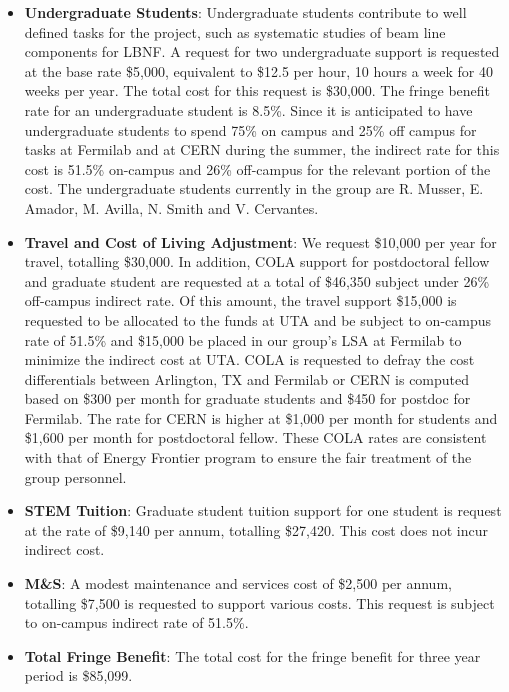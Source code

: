 \begin{enumerate}
\begin{itemize}[noitemsep,nolistsep]
\item {{\bf Undergraduate Students}: Undergraduate students contribute to well defined tasks for the project, such as systematic studies of beam line components for LBNF.  A request for two undergraduate support is requested at the base rate \$5,000, equivalent to \$12.5 per hour, 10 hours a week for 40 weeks per year.  The total cost for this request is \$30,000.  The fringe benefit rate for an undergraduate student is 8.5\%.  Since it is anticipated to have undergraduate students to spend 75\% on campus and 25\% off campus for tasks at Fermilab and at CERN during the summer, the indirect rate for this cost is 51.5\% on-campus and 26\% off-campus for the relevant portion of the cost.   The undergraduate students currently in the group are R. Musser,  E. Amador, M. Avilla, N. Smith and V. Cervantes.}

\item{{\bf Travel and Cost of Living Adjustment}: We request \$10,000 per year for travel, totalling \$30,000.  In addition, COLA support for postdoctoral fellow and graduate student are requested at a total of \$46,350 subject under 26\% off-campus indirect rate.  Of this amount, the travel support \$15,000 is requested to be allocated to the funds at UTA and be subject to on-campus rate of 51.5\% and \$15,000 be placed in our group’s LSA at Fermilab to minimize the indirect cost at UTA. COLA is requested to defray the cost differentials between Arlington, TX and Fermilab or CERN is computed based on \$300 per month for graduate students and \$450 for postdoc for Fermilab.  The rate for CERN is higher at \$1,000 per month for students and \$1,600 per month for postdoctoral fellow.  These COLA rates are consistent with that of Energy Frontier program to ensure the fair treatment of the group personnel.}

\item {{\bf STEM Tuition}: Graduate student tuition support for one student is request at the rate of \$9,140 per annum, totalling \$27,420.  This cost does not incur indirect cost.}

\item {{\bf M\&S}: A modest maintenance and services cost of \$2,500 per annum, totalling \$7,500 is requested to support various costs.   This request is subject to on-campus indirect rate of 51.5\%.}

\item {{\bf Total Fringe Benefit}: The total cost for the fringe benefit for three year period is \$85,099.}


\end{itemize}
\end{enumerate}

